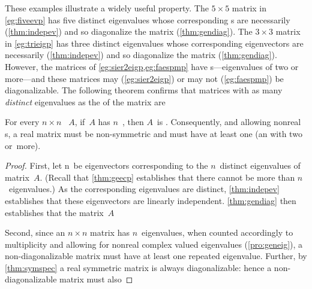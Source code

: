 These examples illustrate a widely useful property.
The \(5\times 5\) matrix in \cref{eg:fiveevp} has five distinct eigenvalues whose corresponding s are necessarily  (\cref{thm:indepev}) and so diagonalize the matrix (\cref{thm:gendiag}).
The \(3\times 3\) matrix in \cref{eg:trieigp} has three distinct eigenvalues whose corresponding eigenvectors are necessarily  (\cref{thm:indepev}) and so diagonalize the matrix (\cref{thm:gendiag}).
However, the matrices of \cref{eg:sier2eigp,eg:faespmp} have s---eigenvalues of  two or more---and these matrices may (\cref{eg:sier2eigp}) or may not (\cref{eg:faespmp}) be diagonalizable.
The following theorem confirms that matrices with as many \emph{distinct} eigenvalues as the  of the matrix are 






\begin{theorem} \label{thm:dlamd} 
For every \(n\times n\) ~\(A\), if~\(A\) has \(n\)~, then \(A\)~is .
Consequently, and allowing nonreal s, a real  matrix must be non-symmetric and must have at least one  (an  with  two or~more).
\end{theorem}
\begin{proof}  
First, let \hlist\vv n\ be eigenvectors corresponding to the \(n\)~distinct eigenvalues of matrix~\(A\).
(Recall that \cref{thm:geecp} establishes that there cannot be more than \(n\)~eigenvalues.)
As the corresponding eigenvalues are distinct, \cref{thm:indepev} establishes that these eigenvectors are linearly independent.
\cref{thm:gendiag} then establishes that the matrix~\(A\) 

Second, since an \(n\times n\) matrix has \(n\)~eigenvalues, when counted accordingly to multiplicity and allowing for nonreal complex valued eigenvalues (\cref{pro:geneig}), a non-diagonalizable matrix must have at least one repeated eigenvalue.  
Further, by \cref{thm:symspec} a real symmetric matrix is always diagonalizable: hence a non-diagonalizable matrix must also 
\end{proof}


